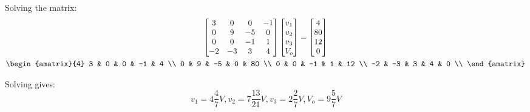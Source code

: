 Solving the matrix:
\begin{gather*}
	\begin{bmatrix}
		3 & 0 & 0 & -1 \\
		0 & 9 & -5 & 0  \\
		0 & 0 & -1 & 1 \\
		-2 & -3 & 3 & 4 \\
	\end{bmatrix}
	\begin{bmatrix}
		v_1 \\ v_2 \\ v_3 \\ V_o
	\end{bmatrix}
	=
	\begin{bmatrix}
		4 \\ 80 \\ 12 \\ 0
	\end{bmatrix}
	\\
	\begin{amatrix}{4}
		3 & 0 & 0 & -1 & 4 \\
		0 & 9 & -5 & 0 & 80 \\
		0 & 0 & -1 & 1 & 12 \\
		-2 & -3 & 3 & 4 & 0 \\
	\end{amatrix}
\end{gather*}



Solving gives:
\[
	v_1 = 4\frac{4}{7}V, v_2 = 7\frac{13}{21}V, v_3 = 2\frac{2}{7}V, V_o = 9\frac{5}{7}V
\]
\clearpage

